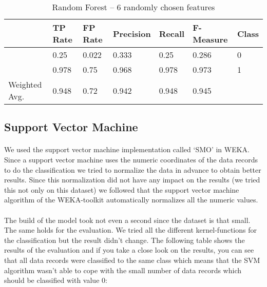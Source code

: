 \documentclass[paper=a4, fontsize=11pt]{scrartcl} %
\numberwithin{equation}{section} %
\numberwithin{figure}{section} %
\numberwithin{table}{section} %
\begin{document}
\begin{table*}[htb]\centering
    \begin{tabular*}{\columnwidth}{@{}lllllll@{}}
        \toprule 
               &  TP Rate &  FP Rate &  Precision &  Recall &  F-Measure &  Class \\ \midrule
               &  0.25    &  0.022   &  0.333     &  0.25   &  0.286     &  0     \\
               &  0.978   &  0.75    &  0.968     &  0.978  &  0.973     &  1     \\
Weighted Avg.  &  0.948   &  0.72    &  0.942     &  0.948  &  0.945     &        \\ \bottomrule
    \end{tabular*}
\caption{Random Forest -- 6 randomly chosen features} 
\label{tab:echo:rand:6f}
\end{table*}
\FloatBarrier

\subsection{Support Vector Machine}

\paragraph{}We used the support vector machine implementation called `SMO' in WEKA. Since a support vector machine uses the numeric coordinates of the data records to do the classification we tried to normalize the data in advance to obtain better results. Since this normalization did not have any impact on the results (we tried this not only on this dataset) we followed that the support vector machine algorithm of the WEKA-toolkit automatically normalizes all the numeric values.

\paragraph{}The build of the model took not even a second since the dataset is that small. The same holds for the evaluation. We tried all the different kernel-functions for the classification but the result didn't change. The following table shows the results of the evaluation and if you take a close look on the results, you can see that all data records were classified to the same class which means that the SVM algorithm wasn't able to cope with the small number of data records which should be classified with value 0:
\end{document}
